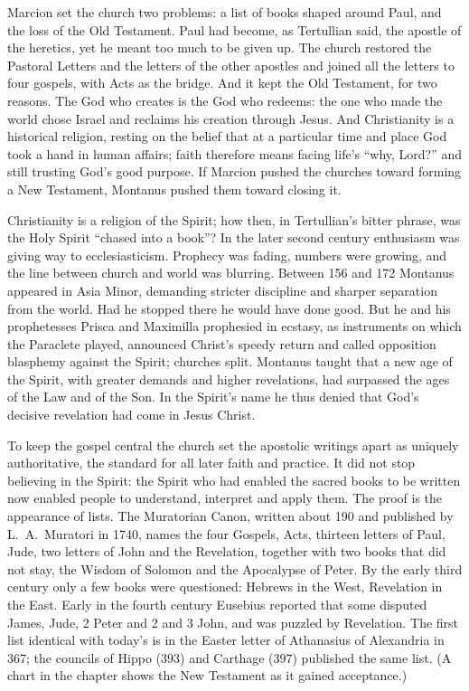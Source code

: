 Marcion set the church two problems: a list of books shaped around Paul, and the loss of the Old
Testament. Paul had become, as Tertullian said, the apostle of the heretics, yet he meant too much to
be given up. The church restored the Pastoral Letters and the letters of the other apostles and
joined all the letters to four gospels, with Acts as the bridge. And it kept the Old Testament, for
two reasons. The God who creates is the God who redeems: the one who made the world chose Israel and
reclaims his creation through Jesus. And Christianity is a historical religion, resting on the belief
that at a particular time and place God took a hand in human affairs; faith therefore means facing
life's ``why, Lord?'' and still trusting God's good purpose. If Marcion pushed the churches toward
forming a New Testament, Montanus pushed them toward closing it.

Christianity is a religion of the Spirit; how then, in Tertullian's bitter phrase, was the Holy
Spirit ``chased into a book''? In the later second century enthusiasm was giving way to
ecclesiasticism. Prophecy was fading, numbers were growing, and the line between church and world was
blurring. Between 156 and 172 Montanus appeared in Asia Minor, demanding stricter discipline and
sharper separation from the world. Had he stopped there he would have done good. But he and his
prophetesses Prisca and Maximilla prophesied in ecstasy, as instruments on which the Paraclete
played, announced Christ's speedy return and called opposition blasphemy against the Spirit; churches
split. Montanus taught that a new age of the Spirit, with greater demands and higher revelations, had
surpassed the ages of the Law and of the Son. In the Spirit's name he thus denied that God's decisive
revelation had come in Jesus Christ.

To keep the gospel central the church set the apostolic writings apart as uniquely authoritative, the
standard for all later faith and practice. It did not stop believing in the Spirit: the Spirit who had
enabled the sacred books to be written now enabled people to understand, interpret and apply them.
The proof is the appearance of lists. The Muratorian Canon, written about 190 and published by
L.~A.~Muratori in 1740, names the four Gospels, Acts, thirteen letters of Paul, Jude, two letters of
John and the Revelation, together with two books that did not stay, the Wisdom of Solomon and the Apocalypse of Peter. By the early third century only a few books were questioned: Hebrews in the West, Revelation
in the East. Early in the fourth century Eusebius reported that some disputed James, Jude, 2 Peter and 2 and 3 John, and was puzzled by Revelation. The first list identical with today's is in the
Easter letter of Athanasius of Alexandria in 367; the councils of Hippo (393) and Carthage (397)
published the same list. (A chart in the chapter shows the New Testament as it gained acceptance.)

